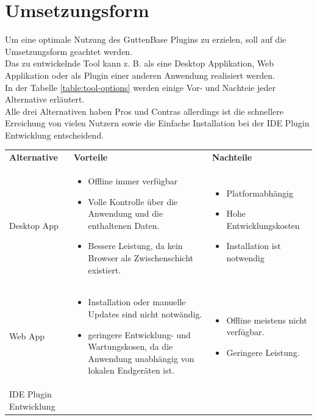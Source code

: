 	\section{Umsetzungsform}
	Um eine optimale Nutzung des GuttenBase Plugins zu erzielen, soll auf die Umsetzungsform geachtet werden.\\
	Das zu entwickelnde Tool kann z. B. als eine Desktop Applikation, Web Applikation oder als Plugin einer anderen Anwendung realisiert werden.\\
	In der Tabelle \ref{table:tool-options} werden einige Vor- und Nachteie jeder Alternative erläutert. \\
	Alle drei Alternativen haben Pros und Contras allerdings ist die schnellere Erreichung von vielen Nutzern sowie die Einfache Installation bei der IDE Plugin Entwicklung entscheidend. 
	\begin{table}
		\centering
		\begin{tabular}{ |p{3cm}|p{6cm}|p{6cm}| }
			\hline
			\textbf{Alternative} & \textbf{Vorteile} &  \textbf{Nachteile}  \\
			Desktop App & 
			\begin{itemize}
				\item Offline immer verfügbar
				\item Volle Kontrolle über die Anwendung und die enthaltenen Daten.
				\item Bessere Leistung, da kein Browser als Zwischenschicht existiert.
			\end{itemize}& 
			\begin{itemize}
				\item Platformabhängig
				\item Hohe Entwicklungskosten
				\item Installation ist notwendig
			\end{itemize} \\
			\hline
			Web App &
			
			\begin{itemize}
				\item Installation oder manuelle Updates sind nicht notwändig. 
				\item geringere Entwicklung- und Wartungskosen, da die Anwendung unabhängig von lokalen Endgeräten ist.
			\end{itemize} &
			
			\begin{itemize}
				\item Offline meistens nicht verfügbar.
				\item Geringere Leistung.
			\end{itemize} \\
			\hline
			IDE Plugin Entwicklung &
			

\end{tabular}
\end{table}
